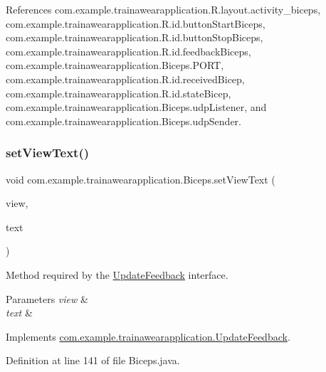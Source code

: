 References com.\+example.\+trainawearapplication.\+R.\+layout.\+activity\+\_\+biceps, com.\+example.\+trainawearapplication.\+R.\+id.\+button\+Start\+Biceps, com.\+example.\+trainawearapplication.\+R.\+id.\+button\+Stop\+Biceps, com.\+example.\+trainawearapplication.\+R.\+id.\+feedback\+Biceps, com.\+example.\+trainawearapplication.\+Biceps.\+P\+O\+RT, com.\+example.\+trainawearapplication.\+R.\+id.\+received\+Bicep, com.\+example.\+trainawearapplication.\+R.\+id.\+state\+Bicep, com.\+example.\+trainawearapplication.\+Biceps.\+udp\+Listener, and com.\+example.\+trainawearapplication.\+Biceps.\+udp\+Sender.

\mbox{\label{classcom_1_1example_1_1trainawearapplication_1_1_biceps_a6e1ab1b99cd05b29fb7346b0642b7d0e}} 
\subsubsection{\texorpdfstring{setViewText()}{setViewText()}}
{\footnotesize\ttfamily void com.\+example.\+trainawearapplication.\+Biceps.\+set\+View\+Text (\begin{DoxyParamCaption}\item[{Text\+View}]{view,  }\item[{String}]{text }\end{DoxyParamCaption})}



Method required by the \mbox{\hyperlink{interfacecom_1_1example_1_1trainawearapplication_1_1_update_feedback}{Update\+Feedback}} interface. 


\begin{DoxyParams}{Parameters}
{\em view} & \\
\hline
{\em text} & \\
\hline
\end{DoxyParams}


Implements \mbox{\hyperlink{interfacecom_1_1example_1_1trainawearapplication_1_1_update_feedback_a7a026880188b11aca6d8184d57e699e8}{com.\+example.\+trainawearapplication.\+Update\+Feedback}}.



Definition at line 141 of file Biceps.\+java.


